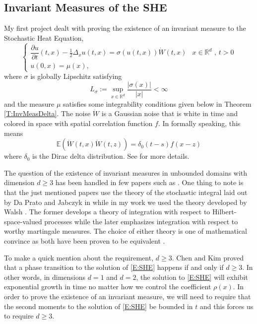 \documentclass[a4paper,11pt]{article}
\numberwithin{equation}{section}
\theoremstyle{plain}
\theoremstyle{definition}
\newcommand{\R}{\mathbb{R}}
\numberwithin{NQ}{section}
\numberwithin{LQ}{section}
\numberwithin{ZQ}{section}
\begin{document}
\subsection{Invariant Measures of the SHE}
\hspace{\parindent} My first project dealt with proving the existence of an invariant measure to the Stochastic Heat Equation,
	\begin{equation}
	\label{E:SHE}
		\begin{cases}
		\dfrac{\partial u}{\partial t}(t,x)-\frac{1}{2}\Delta_x u(t,x) = \sigma(u(t,x))\dot W(t,x) & 	\text{$x\in \R^d$ , $t>0$}
		\\ u(0,x)=\mu(x) ,
		\end{cases}
	\end{equation}
where $\sigma$ is globally Lipschitz satisfying 
	\[
		L_\sigma := \sup_{x\in \R^d} \frac{|\sigma(x)|}{|x|} < \infty 
	\]
and the measure $\mu$ satisfies some integrability conditions given below in Theorem \ref{T:InvMeasDelta}. The noise $\dot{W}$ is a Gaussian noise that is white in time and colored in space with spatial correlation function $f$. In formally speaking, this means 
	\[
		\mathbb{E}\left(\dot{W}(t,x)\dot{W}(t,z)\right) = \delta_0(t-s)f(x-z)
	\]
where $\delta_0$ is the Dirac delta distribution. See \cite[pg. 51]{DalangEtc09Minicourse} for more details. 

The question of the existence of invariant measures in unbounded domains with dimension $d \ge 3$ has been handled in few papers such as \cite{TessitoreZabczyk98M, AM03, MSY15, MSY16}. One thing to note is that the just mentioned papers use the theory of the stochastic integral laid out by Da Prato and Jabczyk in \cite{DZ92} while in my work we used the theory developed by Walsh \cite{Walsh}. The former develops a theory of integration with respect to Hilbert-space-valued processes while the later emphasizes integration with respect to worthy martingale measures. The choice of either theory is one of mathematical convince as both have been proven to be equivalent  \cite{DalQuer}.

To make a quick mention about the requirement, $d \ge 3$. Chen and Kim \cite[Theorem 1.3]{CK15SHE} proved that a phase transition to the solution of \eqref{E:SHE} happens if and only if $d \ge 3$. In other words, in dimensions $d=1$ and $d=2$, the solution to \eqref{E:SHE} will exhibit exponential growth in time no matter how we control the coefficient $\rho(x)$. In order to prove the existence of an invariant measure, we will need to require that the second moments to the solution of \eqref{E:SHE} be bounded in $t$ and this forces us to require $d \ge 3$.   
\end{document}
